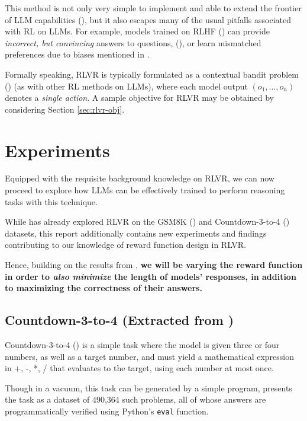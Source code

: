 \documentclass{article} %
\theoremstyle{definition}
\begin{document}
This method is not only very simple to implement and able to extend
the frontier of LLM capabilities (\cite{tulu3, r1}), but it also 
escapes many of the usual pitfalls associated with RL on LLMs. For example, models trained on RLHF (\cite{InstructGPT-2022})
can provide \textit{incorrect, but convincing} answers to questions,
(\cite{Wen-et-al-2024}), or learn mismatched preferences due to biases mentioned in \cite{pitis-2023}.

Formally speaking, RLVR is typically formulated as a contextual bandit problem (\cite{Sutton-and-Barto-1998, contextualbandit})
(as with other RL methods on LLMs), where each model output $(o_1, \dots, o_n)$
denotes a \textit{single action}. A sample objective for RLVR may be obtained 
by considering Section \ref{sec:rlvr-obj}.

\section{Experiments}

Equipped with the requisite background knowledge on RLVR, we can now proceed
to explore how LLMs can be effectively trained to perform reasoning tasks with
this technique.

While \cite{wk10} has already explored RLVR on the GSM8K (\cite{gsm8k}) and 
Countdown-3-to-4 (\cite{countdown}) datasets, this report additionally
contains new experiments and findings contributing to our knowledge
of reward function design in RLVR.

Hence, building on the results from \cite{wk10}, \textbf{we will be varying the reward function
in order to \textit{also minimize} the length of models' responses, in addition
to maximizing the correctness of their answers.}

\subsection{Countdown-3-to-4 (Extracted from \cite{wk10})}

Countdown-3-to-4 (\cite{countdown}) is a simple task where the model is given three or four numbers, as well as a target number,
and must yield a mathematical expression in +, -, *, / that evaluates to the target, using each number at most once.

Though in a vacuum, this task can be generated by a simple program,
\cite{countdown} presents the task as a dataset of 490,364 such problems, all of whose answers
are programmatically verified using Python's \texttt{eval} function.
\end{document}
